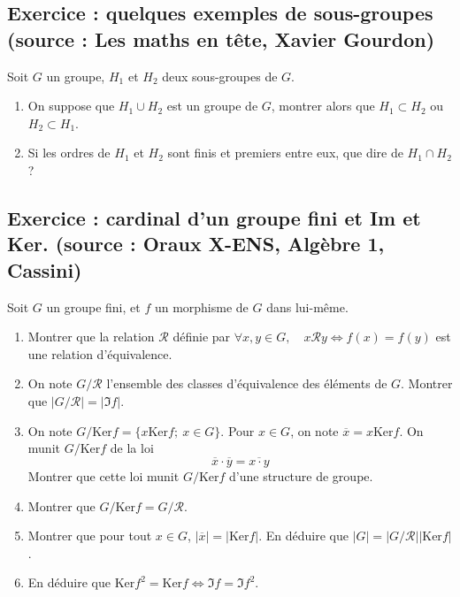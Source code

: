 \documentclass[17pt]{article}
\def\Ker{\text{Ker}}
\def\ssi{\Leftrightarrow}
\begin{document}
	\subsection*{Exercice : quelques exemples de sous-groupes (source : Les maths en tête, Xavier Gourdon)}
	Soit $G$ un groupe, $H_1$ et $H_2$ deux sous-groupes de $G$.
	\begin{enumerate}
		\item On suppose que $H_1\cup H_2$ est un groupe de $G$, montrer alors que $H_1\subset H_2$ ou $H_2\subset H_1$.
		\item Si les ordres de $H_1$ et $H_2$ sont finis et premiers entre eux, que dire de $H_1\cap H_2$ ?
	\end{enumerate}
	\subsection*{Exercice : cardinal d'un groupe fini et Im et Ker. (source : Oraux X-ENS, Algèbre 1, Cassini)}
	Soit $G$ un groupe fini, et $f$ un morphisme de $G$ dans lui-même.
	\begin{enumerate}
		\item Montrer que la relation $\mathcal R$ définie par $\forall x,y\in G,\quad x\mathcal R y\ssi f(x)=f(y)$ est une relation d'équivalence. 
		\item On note $G/\mathcal R$ l'ensemble des classes d'équivalence des éléments de $G$. Montrer que $|G/\mathcal R|=|\Im f|$.
		\item On note $G/\Ker f=\lbrace x\Ker f;\ x\in G\rbrace$. Pour $x\in G$, on note $\overline x=x\Ker f$. On munit $G/\Ker f$ de la loi \[\overline x\cdot\overline y=\overline{x\cdot y}\]
		Montrer que cette loi munit $G/\Ker f$ d'une structure de groupe.
		\item Montrer que $G/\Ker f=G/\mathcal R$.
		\item Montrer que pour tout $x\in G$, $|\overline x|=|\Ker f|$. En déduire que $|G|=|G/\mathcal R||\Ker f|$.
		\item En déduire que $\Ker f^2=\Ker f\ssi \Im f=\Im f^2$.
	\end{enumerate}
\end{document}
